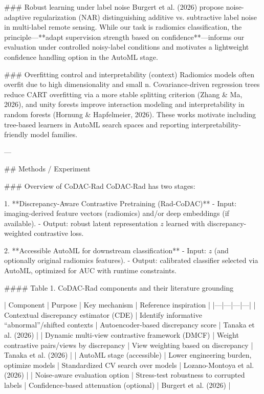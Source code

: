 ### Robust learning under label noise  
Burgert et al. (2026) propose noise-adaptive regularization (NAR) distinguishing additive vs. subtractive label noise in multi-label remote sensing. While our task is radiomics classification, the principle—**adapt supervision strength based on confidence**—informs our evaluation under controlled noisy-label conditions and motivates a lightweight confidence handling option in the AutoML stage.

### Overfitting control and interpretability (context)  
Radiomics models often overfit due to high dimensionality and small n. Covariance-driven regression trees reduce CART overfitting via a more stable splitting criterion (Zhang & Ma, 2026), and unity forests improve interaction modeling and interpretability in random forests (Hornung & Hapfelmeier, 2026). These works motivate including tree-based learners in AutoML search spaces and reporting interpretability-friendly model families.

---

## Methods / Experiment  

### Overview of CoDAC-Rad  
CoDAC-Rad has two stages:

1. **Discrepancy-Aware Contrastive Pretraining (Rad-CoDAC)**  
   - Input: imaging-derived feature vectors (radiomics) and/or deep embeddings (if available).  
   - Output: robust latent representation \( z \) learned with discrepancy-weighted contrastive loss.

2. **Accessible AutoML for downstream classification**  
   - Input: \( z \) (and optionally original radiomics features).  
   - Output: calibrated classifier selected via AutoML, optimized for AUC with runtime constraints.

#### Table 1. CoDAC-Rad components and their literature grounding

| Component | Purpose | Key mechanism | Reference inspiration |
|---|---|---|---|
| Contextual discrepancy estimator (CDE) | Identify informative “abnormal”/shifted contexts | Autoencoder-based discrepancy score | Tanaka et al. (2026) |
| Dynamic multi-view contrastive framework (DMCF) | Weight contrastive pairs/views by discrepancy | View weighting based on discrepancy | Tanaka et al. (2026) |
| AutoML stage (accessible) | Lower engineering burden, optimize models | Standardized CV search over models | Lozano-Montoya et al. (2026) |
| Noise-aware evaluation option | Stress-test robustness to corrupted labels | Confidence-based attenuation (optional) | Burgert et al. (2026) |

